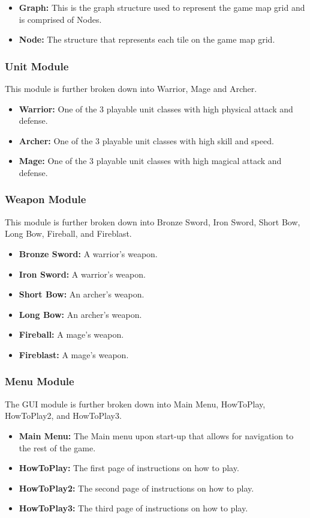 \documentclass{article}
\begin{document}
\begin{itemize}
    \item \textbf{Graph:} This is the graph structure used to represent the game map grid and is comprised of Nodes. 
    \item \textbf{Node:} The structure that represents each tile on the game map grid.
\end{itemize}

\subsubsection{Unit Module}
This module is further broken down into Warrior, Mage and Archer.

\begin{itemize}
    \item \textbf{Warrior:} One of the 3 playable unit classes with high physical attack and defense.
    \item \textbf{Archer:} One of the 3 playable unit classes with high skill and speed.
    \item \textbf{Mage:} One of the 3 playable unit classes with high magical attack and defense.
\end{itemize}

\subsubsection{Weapon Module}
This module is further broken down into Bronze Sword, Iron Sword, Short Bow, Long Bow, Fireball, and Fireblast.
\begin{itemize}
    \item \textbf{Bronze Sword:} A warrior's weapon.
    \item \textbf{Iron Sword:} A warrior's weapon.
    \item \textbf{Short Bow:} An archer's weapon.
    \item \textbf{Long Bow:} An archer's weapon.
    \item \textbf{Fireball:} A mage's weapon.
    \item \textbf{Fireblast:} A mage's weapon.
\end{itemize}

\subsubsection{Menu Module}
The GUI module is further broken down into Main Menu, HowToPlay, HowToPlay2, and HowToPlay3.
\begin{itemize}
    \item \textbf{Main Menu:} The Main menu upon start-up that allows for navigation to the rest of the game.
    \item \textbf{HowToPlay:} The first page of instructions on how to play.
    \item \textbf{HowToPlay2:} The second page of instructions on how to play.
    \item \textbf{HowToPlay3:} The third page of instructions on how to play.
\end{itemize}
\end{document}
